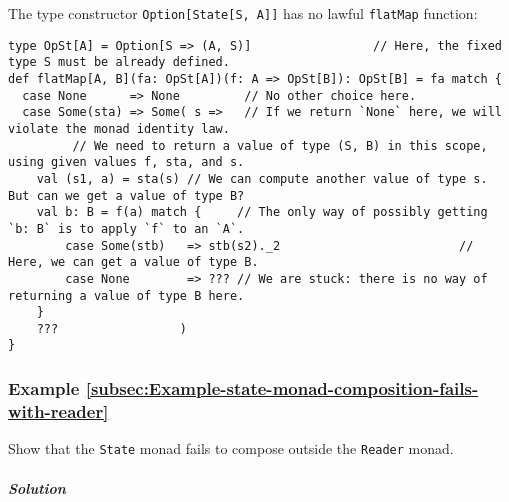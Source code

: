 The type constructor \lstinline!Option[State[S, A]]! has no lawful
\lstinline!flatMap! function:
\begin{lstlisting}
type OpSt[A] = Option[S => (A, S)]                 // Here, the fixed type S must be already defined.
def flatMap[A, B](fa: OpSt[A])(f: A => OpSt[B]): OpSt[B] = fa match {
  case None      => None         // No other choice here.
  case Some(sta) => Some( s =>   // If we return `None` here, we will violate the monad identity law.
         // We need to return a value of type (S, B) in this scope, using given values f, sta, and s.
    val (s1, a) = sta(s) // We can compute another value of type s. But can we get a value of type B?
    val b: B = f(a) match {     // The only way of possibly getting `b: B` is to apply `f` to an `A`.
        case Some(stb)   => stb(s2)._2                         // Here, we can get a value of type B.
        case None        => ??? // We are stuck: there is no way of returning a value of type B here.
    }
    ???                 )
}
\end{lstlisting}


\subsubsection{Example \label{subsec:Example-state-monad-composition-fails-with-reader}\ref{subsec:Example-state-monad-composition-fails-with-reader}}

Show that the \lstinline!State! monad fails to compose outside the
\lstinline!Reader! monad.

\subparagraph{Solution}

